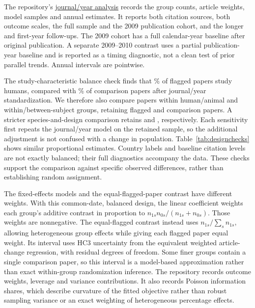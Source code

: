 \documentclass[11pt,letterpaper]{article}
\begin{document}
The repository's \href{https://github.com/recite/sig_fault/tree/main/data/nieuwenhuis/design}{journal/year analysis} records the group counts, article weights, model samples and annual estimates. It reports both citation sources, both outcome scales, the full sample and the 2009 publication cohort, and the longer and first-year follow-ups. The 2009 cohort has a full calendar-year baseline after original publication. A separate 2009--2010 contrast uses a partial publication-year baseline and is reported as a timing diagnostic, not a clean test of prior parallel trends. Annual intervals are pointwise.

The study-characteristic balance check finds that \BalanceHumanFlagged\% of flagged papers study humans, compared with \BalanceHumanComparison\% of comparison papers after journal/year standardization. We therefore also compare papers within human/animal and within/between-subject groups, retaining \DesignMatchedFlagged{} flagged and \DesignMatchedComparison{} comparison papers. A stricter species-and-design comparison retains \DesignSpeciesFlagged{} and \DesignSpeciesComparison{}, respectively. Each sensitivity first repeats the journal/year model on the retained sample, so the additional adjustment is not confused with a change in population. Table~\ref{tab:designchecks} shows similar proportional estimates. Country labels and baseline citation levels are not exactly balanced; their full diagnostics accompany the data. These checks support the comparison against specific observed differences, rather than establishing random assignment.

The fixed-effects models and the equal-flagged-paper contrast have different weights. With this common-date, balanced design, the linear coefficient weights each group's additive contrast in proportion to $n_{1s}n_{0s}/(n_{1s}+n_{0s})$. Those weights are nonnegative. The equal-flagged contrast instead uses $n_{1s}/\sum_s n_{1s}$, allowing heterogeneous group effects while giving each flagged paper equal weight. Its interval uses HC3 uncertainty from the equivalent weighted article-change regression, with residual degrees of freedom. Some finer groups contain a single comparison paper, so this interval is a model-based approximation rather than exact within-group randomization inference. The repository records outcome weights, leverage and variance contributions. It also records Poisson information shares, which describe curvature of the fitted objective rather than robust sampling variance or an exact weighting of heterogeneous percentage effects.
\end{document}
